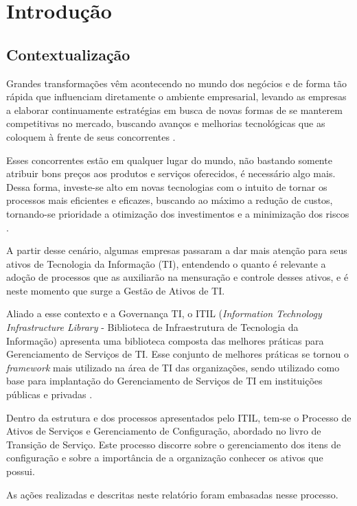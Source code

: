 \chapter{Introdução}


\section{Contextualização}
Grandes transformações vêm acontecendo no mundo dos negócios e de forma tão rápida que influenciam diretamente o ambiente empresarial, levando as empresas a elaborar continuamente estratégias em busca de novas formas de se manterem competitivas no mercado, buscando avanços e melhorias tecnológicas que as coloquem à frente de seus concorrentes \cite{feres}.

Esses concorrentes estão em qualquer lugar do mundo, não bastando somente atribuir bons preços aos produtos e serviços oferecidos, é necessário algo mais. Dessa forma, investe-se alto em novas tecnologias com o intuito de tornar os processos mais eficientes e eficazes, buscando ao máximo a redução de custos, tornando-se prioridade a otimização dos investimentos e a minimização dos riscos \cite{feres}.

A partir desse cenário, algumas empresas passaram a dar mais atenção para seus ativos de Tecnologia da Informação (TI), entendendo o quanto é relevante a adoção de processos que as auxiliarão na mensuração e controle desses ativos, e é neste momento que surge a Gestão de Ativos de TI.

Aliado a esse contexto e a Governança TI, o ITIL (\textit{Information Technology Infrastructure Library} - Biblioteca de Infraestrutura de Tecnologia da Informação) apresenta uma biblioteca composta das melhores práticas para Gerenciamento de Serviços de TI. Esse conjunto de melhores práticas se tornou o \textit{framework} mais utilizado na área de TI das organizações, sendo utilizado como base para implantação do Gerenciamento de Serviços de TI em instituições públicas e privadas \cite{feres}.

Dentro da estrutura e dos processos apresentados pelo ITIL, tem-se o Processo de Ativos de Serviços e Gerenciamento de Configuração, abordado no livro de Transição de Serviço. Este processo discorre sobre o gerenciamento dos itens de configuração e sobre a importância de a organização conhecer os ativos que possui.

As ações realizadas e descritas neste relatório foram embasadas nesse processo.

